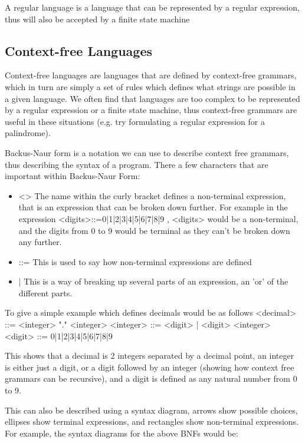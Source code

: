   \noindent
  A regular language is a language that can be represented by a regular expression, thus will also be accepted by a finite state machine
  
\subsection{Context-free Languages}
  
  \noindent
  Context-free languages are languages that are defined by context-free grammars, which in turn are simply a set of rules which defines what strings are possible in a given language. We often find that languages are too complex to be represented by a regular expression or a finite state machine, thus context-free grammars are useful in these situations (e.g. try formulating a regular expression for a palindrome).
  
  Backus-Naur form is a notation we can use to describe context free grammars, thus describing the syntax of a program. There a few characters that are important within Backus-Naur Form:
  \begin{itemize}
  	\item <>
	  	\subitem The name within the curly bracket defines a non-terminal expression, that is an expression that can be broken down further. For example in the expression <digits>::=0|1|2|3|4|5|6|7|8|9 , <digits> would be a non-terminal, and the digits from 0 to 9 would be terminal as they can't be broken down any further.
  	\item ::=
	  	\subitem This is used to say how non-terminal expressions are defined
  	\item |
	  	\subitem This is a way of breaking up several parts of an expression, an 'or' of the different parts.
  \end{itemize}
  
  To give a simple example which defines decimals would be as follows
  <decimal> ::= <integer> "." <integer>
  <integer> ::= <digit> | <digit> <integer>
  <digit> ::= 0|1|2|3|4|5|6|7|8|9
  
  This shows that a decimal is 2 integers separated by a decimal point, an integer is either just a digit, or a digit followed by an integer (showing how context free grammars can be recursive), and a digit is defined as any natural number from 0 to 9.
  
  This can also be described using a syntax diagram, arrows show possible choices, ellipses show terminal expressions, and rectangles show non-terminal expressions. For example, the syntax diagrams for the above BNFs would be:
  
